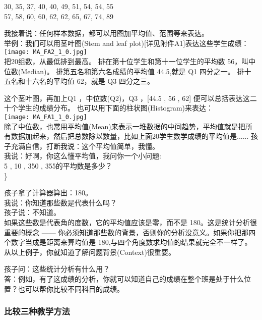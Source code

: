 30, 35, 37, 40, 40, 49, 51, 54, 54, 55\\
57, 58, 60, 60, 62, 62, 65, 67, 74, 89

我接着说：任何样本数据，都可以用图加平均值、范围等来表达。\\
举例：我们可以用茎叶图(Stem and leaf
plot){[}详见附件A1{]}表达这些学生成绩：\\

\texttt{[image: MA\_FA2\_1\_0.jpg]}\\
把20组数，从最低排到最高。 排在第十位学生和第十一位学生的平均数
56，叫中位数(Median)。 排第五名和第六名成绩的平均值 44.5,就是 Q1
四分之一。 排十五名和十六名的平均值 62，就是 Q3 四分之三。

这个茎叶图，再加上Q1 ，中位数(Q2)，Q3 ，{[}44.5 , 56 , 62{]}
便可以总括表达这二十个学生的成绩分布。
也可以用下面的柱状图(Histogram)来表达：\\

\texttt{[image: MA\_FA1\_1\_0.jpg]}\\

除了中位数，也常用平均值(Mean)来表示一堆数据的中间趋势，平均值就是把所有数据加起来，然后把总数除以数量，比如上面20学生数学成绩的平均值是......
孩子充满自信，打断我说：这个平均值简单，我懂。\\
我说：好啊，你这么懂平均值，我问你一个小问题:\\

5 , 10 , 350 ,
355的平均数是多少？\\

\textbar{}\}

孩子拿了计算器算出：180。\\
我说：你知道那些数是代表什么吗？\\
孩子说：不知道。\\
如果这些数是代表角的度数，它的平均值应该是零，而不是
180。这是统计分析很重要的概念 ------
你必须知道那些数的背景，否则你的分析没意义。如果你把那四个数字当成是距离来算均值是
180,与四个角度数求均值的结果就完全不一样了。\\
从以上例子，你就知道了解问题背景(Context)很重要。

孩子问：这些统计分析有什么用？\\
答：例如，有了这成绩的分析，你就可以知道自己的成绩在整个班是处于什么位置？也可以帮你比较不同科目的成绩。

\hypertarget{ux6bd4ux8f83ux4e09ux79cdux6559ux5b66ux65b9ux6cd5}{%
\subsubsection{比较三种教学方法}\label{ux6bd4ux8f83ux4e09ux79cdux6559ux5b66ux65b9ux6cd5}}

